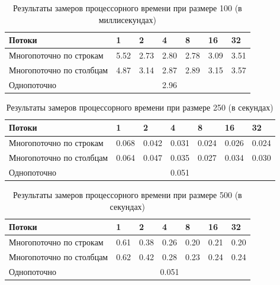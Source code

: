 \documentclass[12pt,a4paper]{report}
\begin{document}
\begin{table}[h!]
\caption{Результаты замеров процессорного времени при размере 100 (в миллисекундах)}
\label{tabular:timesandtenses}
\begin{center}
\begin{tabular}{ | l | l | l | l | l | l | l | }
\hline
        Потоки                   & 1    & 2    & 4    & 8    & 16   & 32   \\ \hline
        Многопоточно по строкам  & 5.52 & 2.73 & 2.80 & 2.78 & 3.09 & 3.51 \\ \hline
        Многопоточно по столбцам & 4.87 & 3.14 & 2.87 & 2.89 & 3.15 & 3.57 \\ \hline
        Однопоточно              &      \multicolumn{5}{c}{2.96}    &      \\ \hline
\end{tabular}
\end{center}
\end{table}

\begin{table}[h!]
\caption{Результаты замеров процессорного времени при размере 250 (в секундах)}
\label{tabular:timesandtenses}
\begin{center}
\begin{tabular}{ | l | l | l | l | l | l | l | }
\hline
        Потоки                   & 1     & 2     & 4     & 8     & 16    & 32    \\ \hline
        Многопоточно по строкам  & 0.068 & 0.042 & 0.031 & 0.024 & 0.026 & 0.024 \\ \hline
        Многопоточно по столбцам & 0.064 & 0.047 & 0.035 & 0.027 & 0.034 & 0.030 \\ \hline
        Однопоточно              &       \multicolumn{5}{c}{0.051}       &       \\ \hline
\end{tabular}
\end{center}
\end{table}

\begin{table}[h!]
\caption{Результаты замеров процессорного времени при размере 500 (в секундах)}
\label{tabular:timesandtenses}
\begin{center}
\begin{tabular}{ | l | l | l | l | l | l | l | }
\hline
        Потоки                   & 1    & 2    & 4    & 8    & 16   & 32   \\ \hline
        Многопоточно по строкам  & 0.61 & 0.38 & 0.26 & 0.20 & 0.21 & 0.20 \\ \hline
        Многопоточно по столбцам & 0.62 & 0.42 & 0.28 & 0.23 & 0.24 & 0.24 \\ \hline
        Однопоточно              &     \multicolumn{5}{c}{0.051}    &      \\ \hline
\end{tabular}
\end{center}
\end{table}
\end{document}
